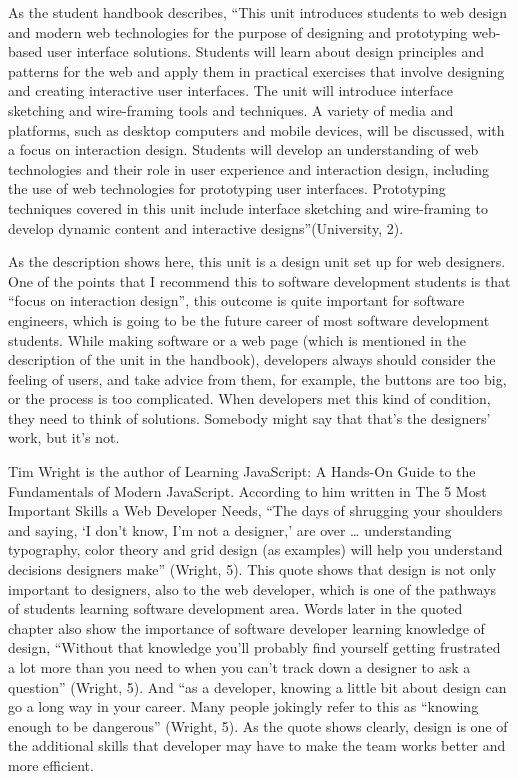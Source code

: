 \documentclass[12pt]{article}
\begin{document}
As the student handbook describes, “This unit introduces students to web design and modern web technologies for the purpose of designing and prototyping web-based user interface solutions. Students will learn about design principles and patterns for the web and apply them in practical exercises that involve designing and creating interactive user interfaces. The unit will introduce interface sketching and wire-framing tools and techniques. A variety of media and platforms, such as desktop computers and mobile devices, will be discussed, with a focus on interaction design. Students will develop an understanding of web technologies and their role in user experience and interaction design, including the use of web technologies for prototyping user interfaces. Prototyping techniques covered in this unit include interface sketching and wire-framing to develop dynamic content and interactive designs”(University, 2).

As the description shows here, this unit is a design unit set up for web designers. One of the points that I recommend this to software development students is that “focus on interaction design”, this outcome is quite important for software engineers, which is going to be the future career of most software development students. While making software or a web page (which is mentioned in the description of the unit in the handbook), developers always should consider the feeling of users, and take advice from them, for example, the buttons are too big, or the process is too complicated. When developers met this kind of condition, they need to think of solutions. Somebody might say that that’s the designers’ work, but it’s not.

Tim Wright is the author of Learning JavaScript: A Hands-On Guide to the Fundamentals of Modern JavaScript. According to him written in The 5 Most Important Skills a Web Developer Needs, “The days of shrugging your shoulders and saying, ‘I don’t know, I’m not a designer,’ are over … understanding typography, color theory and grid design (as examples) will help you understand decisions designers make” (Wright, 5). This quote shows that design is not only important to designers, also to the web developer, which is one of the pathways of students learning software development area. Words later in the quoted chapter also show the importance of software developer learning knowledge of design, “Without that knowledge you’ll probably find yourself getting frustrated a lot more than you need to when you can’t track down a designer to ask a question” (Wright, 5). And “as a developer, knowing a little bit about design can go a long way in your career. Many people jokingly refer to this as “knowing enough to be dangerous” (Wright, 5). As the quote shows clearly, design is one of the additional skills that developer may have to make the team works better and more efficient.
\end{document}
